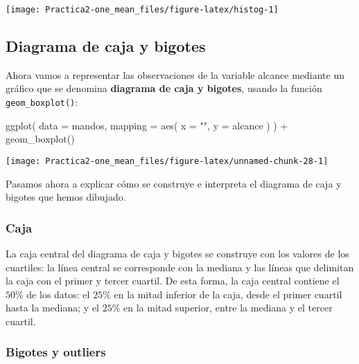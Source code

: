 \documentclass[
  degree=mecinf,
  title=normal,
  toc=normal,
  bib=normal]{mnye}
\newenvironment{Shaded}{\begin{snugshade}}{\end{snugshade}}
\newcommand{\AttributeTok}[1]{\textcolor[rgb]{0.77,0.63,0.00}{#1}}
\newcommand{\FunctionTok}[1]{\textcolor[rgb]{0.00,0.00,0.00}{#1}}
\newcommand{\NormalTok}[1]{#1}
\newcommand{\SpecialCharTok}[1]{\textcolor[rgb]{0.00,0.00,0.00}{#1}}
\newcommand{\StringTok}[1]{\textcolor[rgb]{0.31,0.60,0.02}{#1}}
\begin{document}
\begin{center}\texttt{[image: Practica2-one\_mean\_files/figure-latex/histog-1]} \end{center}

\hypertarget{boxplot}{%
\subsection{Diagrama de caja y bigotes}\label{boxplot}}

Ahora vamos a representar las observaciones de la variable alcance mediante un gráfico que se denomina \textbf{diagrama de caja y bigotes}, usando la función \texttt{geom\_boxplot()}:

\begin{Shaded}
\begin{Highlighting}[]
\FunctionTok{ggplot}\NormalTok{(}
    \AttributeTok{data =}\NormalTok{ mandos,}
    \AttributeTok{mapping =} \FunctionTok{aes}\NormalTok{(}
        \AttributeTok{x =} \StringTok{""}\NormalTok{,}
        \AttributeTok{y =}\NormalTok{ alcance}
\NormalTok{    )}
\NormalTok{) }\SpecialCharTok{+}
\FunctionTok{geom\_boxplot}\NormalTok{()}
\end{Highlighting}
\end{Shaded}

\begin{center}\texttt{[image: Practica2-one\_mean\_files/figure-latex/unnamed-chunk-28-1]} \end{center}

Pasamos ahora a explicar cómo se construye e interpreta el diagrama de caja y bigotes que hemos dibujado.

\hypertarget{caja}{%
\subsubsection{Caja}\label{caja}}

La caja central del diagrama de caja y bigotes se construye con los valores de los cuartiles: la línea central se corresponde con la mediana y las líneas que delimitan la caja con el primer y tercer cuartil. De esta forma, la caja central contiene el \(50\%\) de los datos: el \(25\%\) en la mitad inferior de la caja, desde el primer cuartil hasta la mediana; y el \(25\%\) en la mitad superior, entre la mediana y el tercer cuartil.

\hypertarget{bigotes-y-outliers}{%
\subsubsection{Bigotes y outliers}\label{bigotes-y-outliers}}
\end{document}
